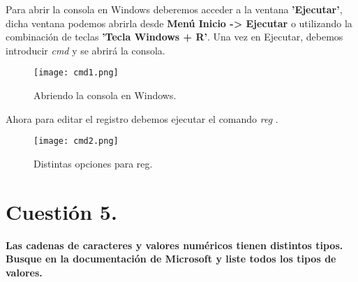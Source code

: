 \documentclass[a4paper, 10pt]{article} %
\begin{document}
Para abrir la consola en Windows deberemos acceder a la ventana \textbf{'Ejecutar'}, dicha ventana podemos abrirla desde \textbf{Menú Inicio -> Ejecutar} o utilizando la combinación de teclas \textbf{'Tecla Windows + R'}. Una vez en Ejecutar, debemos introducir \textit{cmd} y se abrirá la consola.

\begin{figure}[H]
\centering 
\texttt{[image: cmd1.png]} 
\caption{Abriendo la consola en Windows.} 
\label{contexto:figura} 
\end{figure}

Ahora para editar el registro debemos ejecutar el comando \textit{reg} \cite{4}.

\begin{figure}[H]
\centering 
\texttt{[image: cmd2.png]} 
\caption{Distintas opciones para reg.} 
\label{contexto:figura} 
\end{figure}

\pagebreak

\section{Cuestión 5.}
\textbf{Las cadenas de caracteres y valores numéricos tienen distintos tipos. Busque en la documentación de Microsoft y liste todos los tipos de valores.}\\
\end{document}

